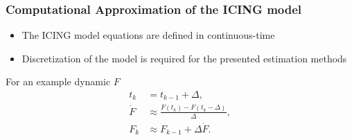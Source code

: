 \documentclass[aspectratio=43]{beamer}
\begin{document}

\begin{frame}
 \frametitle{Computational Approximation of the ICING model} 
 \begin{itemize}
    \item The ICING model equations are defined in continuous-time
    \item Discretization of the model is required for the presented estimation methods
 \end{itemize}
  \vspace{0.2em}
  \begin{exampleblock}{For an example dynamic $F$}
   \begin{align*}
    t_k &= t_{k-1} + \Delta, \\
    \dot{F} &\approx \frac{F(t_{k}) - F(t_{k} - \Delta)}{\Delta}, \\
    F_{k} &\approx F_{k-1} + \Delta \dot{F}.
   \end{align*} 
  \end{exampleblock}
\end{frame}
\end{document}
